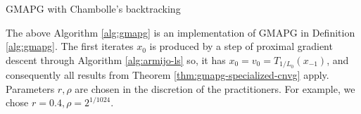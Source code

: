 \documentclass[12pt]{report}
\begin{document}
\begin{algorithm}[H]
\begin{algorithmic}[1]
{                        }
                        \ENDIF
                    \ENDFOR
                \caption{GMAPG with Chambolle's backtracking}\label{alg:gmapg}
                \end{algorithmic}
            \end{algorithm}
            The above Algorithm \ref{alg:gmapg} is an implementation of GMAPG in Definition \ref{alg:gmapg}. 
            The first iterates $x_0$ is produced by a step of proximal gradient descent through Algorithm \ref{alg:armijo-ls} so, it has $x_0 = v_0 = T_{1/L_0}(x_{-1})$, and consequently all results from Theorem \ref{thm:gmapg-specialized-cnvg} apply. 
            Parameters $r, \rho$ are chosen in the discretion of the practitioners. 
            For example, we chose $r= 0.4, \rho = 2^{1/1024}$. 
    
\end{document}
